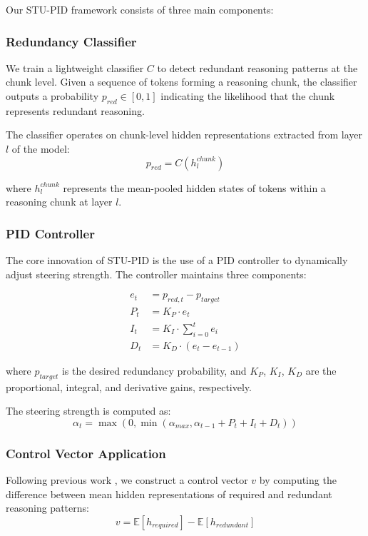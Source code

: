 \documentclass{article}
\begin{document}
Our STU-PID framework consists of three main components:

\subsubsection{Redundancy Classifier}

We train a lightweight classifier $C$ to detect redundant reasoning patterns at the chunk level. Given a sequence of tokens forming a reasoning chunk, the classifier outputs a probability $p_{red} \in [0,1]$ indicating the likelihood that the chunk represents redundant reasoning.

The classifier operates on chunk-level hidden representations extracted from layer $l$ of the model:
$$p_{red} = C(h_l^{chunk})$$

where $h_l^{chunk}$ represents the mean-pooled hidden states of tokens within a reasoning chunk at layer $l$.

\subsubsection{PID Controller}

The core innovation of STU-PID is the use of a PID controller to dynamically adjust steering strength. The controller maintains three components:

\begin{align}
e_t &= p_{red,t} - p_{target} \\
P_t &= K_P \cdot e_t \\
I_t &= K_I \cdot \sum_{i=0}^{t} e_i \\
D_t &= K_D \cdot (e_t - e_{t-1})
\end{align}

where $p_{target}$ is the desired redundancy probability, and $K_P$, $K_I$, $K_D$ are the proportional, integral, and derivative gains, respectively.

The steering strength is computed as:
$$\alpha_t = \max(0, \min(\alpha_{max}, \alpha_{t-1} + P_t + I_t + D_t))$$

\subsubsection{Control Vector Application}

Following previous work \cite{chen2025seal}, we construct a control vector $v$ by computing the difference between mean hidden representations of required and redundant reasoning patterns:
$$v = \mathbb{E}[h_{required}] - \mathbb{E}[h_{redundant}]$$
\end{document}
